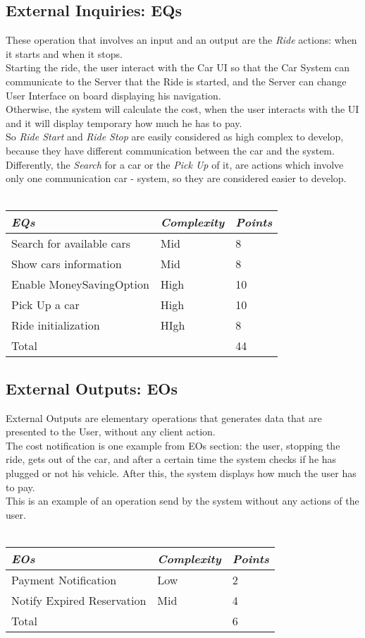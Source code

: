 \documentclass[11pt,a4paper]{report}
\begin{document}
\subsection{External Inquiries: EQs}
These operation that involves an input and an output are the \textit{Ride} actions: when it starts and when it stops.\\
Starting the ride, the user interact with the Car UI so that the Car System can communicate to the Server that the Ride is started, and the Server can change User Interface on board displaying his navigation.\\
Otherwise, the system will calculate the cost, when the user interacts with the UI and it will display temporary how much he has to pay.\\
So \textit{Ride Start} and \textit{Ride Stop} are easily considered as high complex to develop, because they have different communication between the car and the system.\\
Differently, the \textit{Search} for a car or the \textit{Pick Up} of it, are actions which involve only one communication car - system, so they are considered easier to develop.\\\\
\begin{tabularx}{\textwidth}{|X|X|X|}
	\hline
	\textit{EQs} & \textit{Complexity} & \textit{Points}\\
	\hline
	Search for available cars & Mid & 8\\
	Show cars information & Mid & 8\\
	Enable MoneySavingOption & High & 10\\
	Pick Up a car & High & 10\\
	Ride initialization & HIgh & 8\\
	\hline
	\hline
	Total & \multicolumn{1}{X}{} & \multicolumn{1}{X|}{44}\\
	\hline
\end{tabularx}
\subsection{External Outputs: EOs}
External Outputs are elementary operations that generates data that are presented to the User, without any client action.\\
The cost notification is one example from EOs section: the user, stopping the ride, gets out of the car, and after a certain time the system checks if he has plugged or not his vehicle. After this, the system displays how much the user has to pay.\\ This is an example of an operation send by the system without any actions of the user.
\\\\
\begin{tabularx}{\textwidth}{|X|X|X|}
	\hline
	\textit{EOs} & \textit{Complexity} & \textit{Points}\\
	\hline
	Payment Notification & Low & 2\\
	Notify Expired Reservation & Mid & 4\\
	\hline
	\hline
	Total & \multicolumn{1}{X}{} & \multicolumn{1}{X|}{6}\\
	\hline
\end{tabularx}
\end{document}
